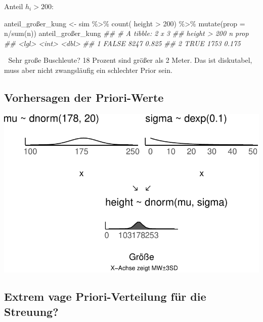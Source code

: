 \documentclass[
  a4paper,
  DIV=11]{scrreprt}
\newenvironment{Shaded}{\begin{snugshade}}{\end{snugshade}}
\newcommand{\AttributeTok}[1]{\textcolor[rgb]{0.40,0.45,0.13}{#1}}
\newcommand{\DecValTok}[1]{\textcolor[rgb]{0.68,0.00,0.00}{#1}}
\newcommand{\DocumentationTok}[1]{\textcolor[rgb]{0.37,0.37,0.37}{\textit{#1}}}
\newcommand{\FunctionTok}[1]{\textcolor[rgb]{0.28,0.35,0.67}{#1}}
\newcommand{\NormalTok}[1]{\textcolor[rgb]{0.00,0.23,0.31}{#1}}
\newcommand{\OtherTok}[1]{\textcolor[rgb]{0.00,0.23,0.31}{#1}}
\newcommand{\SpecialCharTok}[1]{\textcolor[rgb]{0.37,0.37,0.37}{#1}}
\theoremstyle{definition}
\theoremstyle{remark}
\begin{document}
Anteil \(h_i > 200\):

\begin{Shaded}
\begin{Highlighting}[]
\NormalTok{anteil\_großer\_kung }\OtherTok{\textless{}{-}} 
\NormalTok{sim }\SpecialCharTok{\%\textgreater{}\%} 
  \FunctionTok{count}\NormalTok{( height }\SpecialCharTok{\textgreater{}} \DecValTok{200}\NormalTok{) }\SpecialCharTok{\%\textgreater{}\%} 
  \FunctionTok{mutate}\NormalTok{(}\AttributeTok{prop =}\NormalTok{ n}\SpecialCharTok{/}\FunctionTok{sum}\NormalTok{(n))}
\NormalTok{anteil\_großer\_kung}
\DocumentationTok{\#\# \# A tibble: 2 x 3}
\DocumentationTok{\#\#   \textasciigrave{}height \textgreater{} 200\textasciigrave{}     n  prop}
\DocumentationTok{\#\#   \textless{}lgl\textgreater{}          \textless{}int\textgreater{} \textless{}dbl\textgreater{}}
\DocumentationTok{\#\# 1 FALSE           8247 0.825}
\DocumentationTok{\#\# 2 TRUE            1753 0.175}
\end{Highlighting}
\end{Shaded}

🤔 Sehr große Buschleute? 18 Prozent sind größer als 2 Meter. Das ist
diskutabel, muss aber nicht zwangsläufig ein schlechter Prior sein.

\hypertarget{vorhersagen-der-priori-werte}{%
\subsection{Vorhersagen der
Priori-Werte}\label{vorhersagen-der-priori-werte}}

\includegraphics{./gauss_files/figure-pdf/Kung-15-1.pdf}

\hypertarget{extrem-vage-priori-verteilung-fuxfcr-die-streuung}{%
\subsection{Extrem vage Priori-Verteilung für die
Streuung?}\label{extrem-vage-priori-verteilung-fuxfcr-die-streuung}}
\end{document}
